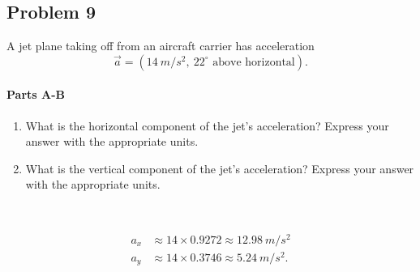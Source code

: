 
\newpage

\subsection{Problem 9}

A jet plane taking off from an aircraft carrier has acceleration
\[
	\vec{a} = \left( \SI{14}{m/s^2},\ 22^\circ \text{ above horizontal} \right).
\]

\setcounter{partcounter}{2}
\paragraph{Parts A-B}

\begin{enumerate}[label=\Alph*.]
	\item What is the horizontal component of the jet's acceleration? Express your answer with the appropriate units.
	\item What is the vertical component of the jet's acceleration? Express your answer with the appropriate units.
\end{enumerate}

~

\begin{solution}
	\begin{align*}
		a_x &\approx 14 \times 0.9272 \approx \SI{12.98}{m/s^2} \\
		a_y &\approx 14 \times 0.3746 \approx \SI{5.24}{m/s^2}
		.\end{align*}
\end{solution}

\newpage
